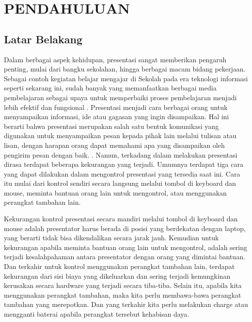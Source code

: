 \chapter{PENDAHULUAN}
\label{chap:pendahuluan}


\section{Latar Belakang}
\label{sec:latarbelakang}

Dalam berbagai aspek kehidupan, presentasi sangat memberikan pengaruh penting, mulai dari bangku sekolahan, hingga berbagai macam bidang pekerjaan. Sebagai contoh kegiatan belajar mengajar di Sekolah pada era teknologi informasi seperti sekarang ini, sudah banyak yang memanfaatkan berbagai media pembelajaran sebagai upaya untuk memperbaiki proses pembelajaran menjadi lebih efektif dan fungsional \parencite{Rasmila2022}. Presentasi menjadi cara berbagai orang untuk menyampaikan informasi, ide atau gagasan yang ingin disampaikan. Hal ini berarti bahwa presentasi merupakan salah satu bentuk komunikasi yang digunakan untuk menyampaikan pesan kepada pihak lain melalui tulisan atau lisan, dengan harapan orang dapat memahami apa yang disampaikan oleh pengirim pesan dengan baik. \parencite{Hilmia2016}. Namun, terkadang dalam melakukan presentasi dirasa terdapat beberapa kekurangan yang terjadi. Umumnya terdapat tiga cara yang dapat dilakukan dalam mengontrol presentasi yang tersedia saat ini. Cara itu mulai dari kontrol sendiri secara langsung melalui tombol di keyboard dan mouse, meminta bantuan orang lain untuk mengontrol, atau menggunakan perangkat tambahan lain.\parencite{MuhammadIdress2021} 

Kekurangan kontrol presentasi secara mandiri melalui tombol di keyboard dan mouse adalah presentator harus berada di posisi yang berdekatan dengan laptop, yang berarti tidak bisa dikendalikan secara jarak jauh. Kemudian untuk kekurangan apabila meminta bantuan orang lain untuk mengontrol, adalah sering terjadi kesalahpahaman antara presentator dengan orang yang dimintai bantuan. Dan terkahir untuk kontrol menggunakan perangkat tambahan lain, terdapat kekurangan dari sisi biaya yang dikeluarkan dan sering terjadi kemungkinan kerusakan secara hardware yang terjadi secara tiba-tiba. Selain itu, apabila kita menggunakan perangkat tambahan, maka kita perlu membawa-bawa perangkat tambahan yang merepotkan. Dan yang terkahir kita perlu melakukan charge atau mengganti baterai apabila perangkat tersebut kehabisan daya.\parencite{Rahmad2022}

